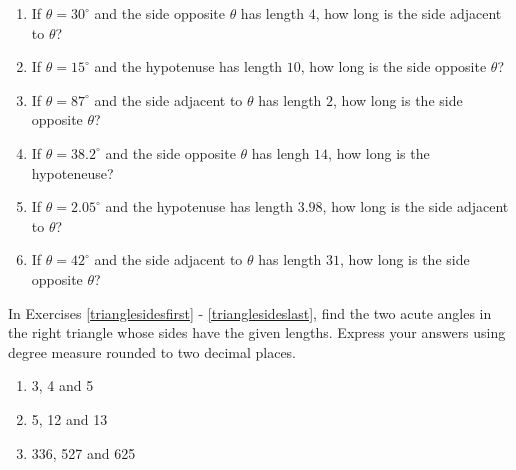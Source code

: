 \documentclass{ximera}
\begin{document}
\begin{enumerate}

\setcounter{enumi}{\value{HW}}

\item  If $\theta = 30^{\circ}$ and the side opposite $\theta$ has length $4$, how long is the side adjacent to $\theta$? \label{moretrianglecircfirst}

\item  If $\theta = 15^{\circ}$ and the hypotenuse has length $10$, how long is the side opposite $\theta$?

\item  If $\theta = 87^{\circ}$ and the side adjacent to $\theta$ has length $2$, how long is the side opposite $\theta$?

\item  If $\theta = 38.2^{\circ}$ and the side opposite $\theta$ has lengh $14$, how long is the hypoteneuse?

\item  If $\theta = 2.05^{\circ}$ and the hypotenuse has length $3.98$, how long is the side adjacent to $\theta$?

\item  If $\theta = 42^{\circ}$ and the side adjacent to $\theta$ has length $31$, how long is the side opposite $\theta$? \label{moretrianglecirclast}

\setcounter{HW}{\value{enumi}}

\end{enumerate}

In Exercises \ref{trianglesidesfirst} - \ref{trianglesideslast}, find the two acute angles in the right triangle whose sides have the given lengths.  Express your answers using degree measure rounded to two decimal places.

\begin{multicols}{3}

\begin{enumerate}

\setcounter{enumi}{\value{HW}}

\item 3, 4 and 5 \label{trianglesidesfirst}

\item 5, 12 and 13

\item 336, 527 and 625 \label{trianglesideslast}

\setcounter{HW}{\value{enumi}}

\end{enumerate}

\end{multicols}
\end{document}
